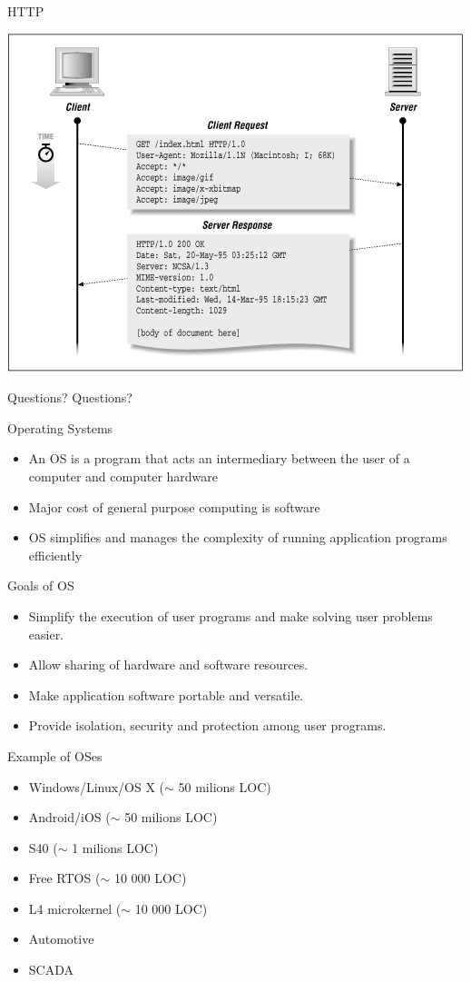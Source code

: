 \documentclass{beamer}
\begin{document}
\begin{frame}{HTTP}
\begin{center}
    \includegraphics[width=0.7\linewidth]{http}
\end{center}
\end{frame}

\begin{frame}{Questions?}
    Questions?
\end{frame}

\begin{frame}{Operating Systems}
  \begin{itemize}
  \item An OS is a program that acts an intermediary
    between the user of a computer and computer
    hardware
  \item Major cost of general purpose computing is
    software
  \item OS simplifies and manages the complexity of running
    application programs efficiently
  \end{itemize}
\end{frame}

\begin{frame}{Goals of OS}
  \begin{itemize}
  \item Simplify the execution of user programs and
    make solving user problems easier.
  \item Allow sharing of hardware and software resources.
  \item Make application software portable and versatile.
  \item Provide isolation, security and protection among
    user programs.
  \end{itemize}
\end{frame}

\begin{frame}{Example of OSes}
  \begin{itemize}
  \item Windows/Linux/OS X ($\sim$ 50 milions LOC)
  \item<2-> Android/iOS ($\sim$ 50 milions LOC)
  \item<3-> S40 ($\sim$ 1 milions LOC)
  \item<4-> Free RTOS ($\sim$ 10 000 LOC)
  \item<5-> L4 microkernel ($\sim$ 10 000 LOC)
  \item<6-> Automotive
  \item<7-> SCADA
  \end{itemize}
\end{frame}
\end{document}
